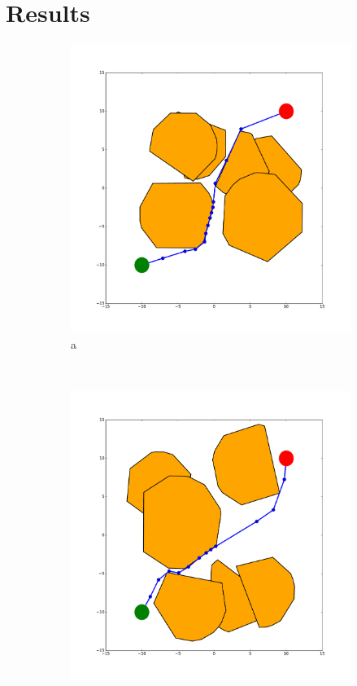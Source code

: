 \documentclass[12pt]{article}
\begin{document}
\section{Results}

\begin{figure}[t!]
    \centering
    \begin{subfigure}[t]{0.32\textwidth}
        \centering
        \includegraphics[width=\textwidth]{2d_example_1.pdf}
        \caption{a}
    \end{subfigure}%
    ~ 
    \begin{subfigure}[t]{0.32\textwidth}
        \centering
        \includegraphics[width=\textwidth]{2d_example_2.pdf}

\end{subfigure}
\end{figure}
\end{document}
